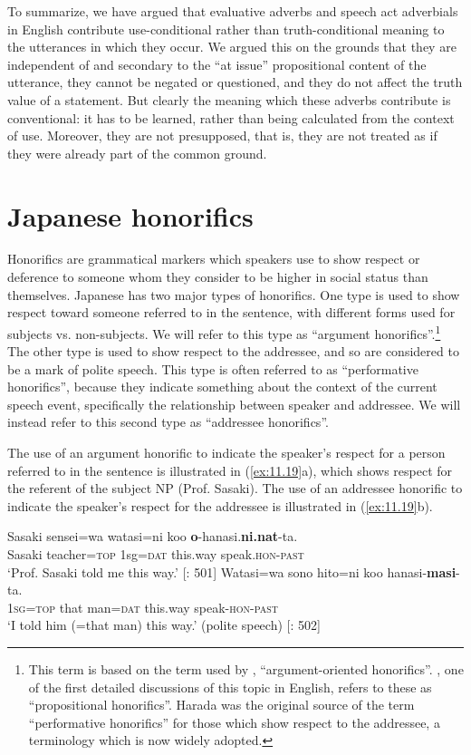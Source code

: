 To summarize, we have argued that evaluative adverbs and speech act adverbials in English contribute use-conditional rather than truth-conditional meaning to the utterances in which they occur. We argued this on the grounds that they are independent of and secondary to the “at issue” propositional content of the utterance, they cannot be negated or questioned, and they do not affect the truth value of a statement. But clearly the meaning which these adverbs contribute is conventional: it has to be learned, rather than being calculated from the context of use. Moreover, they are not presupposed, that is, they are not treated as if they were already part of the common ground.


\section{Japanese honorifics}\label{sec:11.3}

Honorifics are grammatical markers which speakers use to show respect or deference to someone whom they consider to be higher in social status than themselves. Japanese has two major types of honorifics. One type is used to show respect toward someone referred to in the sentence, with different forms used for subjects vs. non-subjects. We will refer to this type as “argument honorifics”.\footnote{This term is based on the term used by \citet{Potts2005}, “argument-oriented honorifics”. \citet{Harada1976}, one of the first detailed discussions of this topic in English, refers to these as “propositional honorifics”. Harada was the original source of the term “performative honorifics” for those which show respect to the addressee, a terminology which is now widely adopted.} The other type is used to show respect to the addressee, and so are considered to be a mark of polite speech. This type is often referred to as “performative honorifics”, because they indicate something about the context of the current speech event, specifically the relationship between speaker and addressee. We will instead refer to this second type as “addressee honorifics”.



The use of an argument honorific to indicate the speaker’s respect for a person referred to in the sentence is illustrated in (\ref{ex:11.19}a), which shows respect for the referent of the subject NP (Prof. Sasaki). The use of an addressee honorific to indicate the speaker’s respect for the addressee is illustrated in (\ref{ex:11.19}b).


\ea \label{ex:11.19}
\ea   \gll Sasaki  sensei=wa  watasi=ni  koo  \textbf{o}-hanasi.\textbf{ni.nat}-ta.\\
Sasaki  teacher=\textsc{top}  1sg=\textsc{dat}  this.way  speak.\textsc{hon-past}\\
\glt ‘Prof. Sasaki told me this way.’  [\citealt{Harada1976}: 501]
\ex \gll
    Watasi=wa  sono  hito=ni  koo  hanasi-\textbf{masi}-ta.\\
\textsc{1sg}=\textsc{top}  that  man=\textsc{dat}  this.way  speak-\textsc{hon-past}\\
\glt ‘I told him (=that man) this way.’  (polite speech)   [\citealt{Harada1976}: 502]
\z \z


